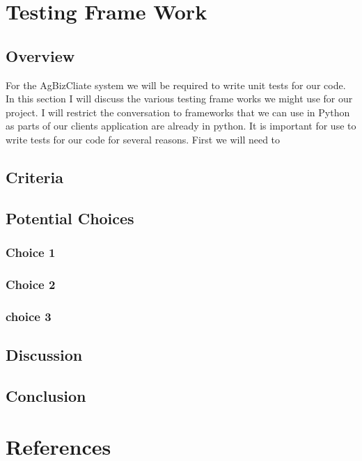 \documentclass[letterpaper,10pt]{article}
\begin{document}
	
\section{Testing Frame Work}
		\subsection{Overview}
						For the AgBizCliate system we will be required to write unit tests for our code. In this section I will discuss the various testing frame works we might use for our project. I will restrict the conversation to frameworks that we can use in Python as parts of our clients application are already in python. It is important for use to write tests for our code for several reasons. First we will need to 

	
	\subsection{Criteria}
	
	\subsection{Potential Choices}
		\subsubsection{Choice 1}
		
		\subsubsection{Choice 2}
		
		\subsubsection{choice 3}
		
	\subsection{Discussion}
	
	\subsection{Conclusion}
	
\section{References}
\end{document}
